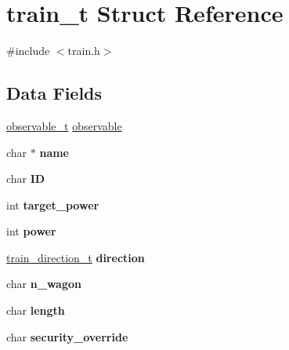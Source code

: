\hypertarget{structtrain__t}{\section{train\-\_\-t Struct Reference}
\label{structtrain__t}
}


{\ttfamily \#include $<$train.\-h$>$}

\subsection*{Data Fields}
\begin{DoxyCompactItemize}
\item 
\hyperlink{structobservable__t}{observable\-\_\-t} \hyperlink{structtrain__t_a39d603215eb7e0ade0ee0fbbb14f0685}{observable}
\item 
\hypertarget{structtrain__t_a866388e08694084c03d04d70c3c9541e}{char $\ast$ {\bfseries name}}\label{structtrain__t_a866388e08694084c03d04d70c3c9541e}

\item 
\hypertarget{structtrain__t_ab1d435bd12429c65c6cacfcba690e2f6}{char {\bfseries I\-D}}\label{structtrain__t_ab1d435bd12429c65c6cacfcba690e2f6}

\item 
\hypertarget{structtrain__t_aaca9fd05b60b4fae0e8e9c61373ebd28}{int {\bfseries target\-\_\-power}}\label{structtrain__t_aaca9fd05b60b4fae0e8e9c61373ebd28}

\item 
\hypertarget{structtrain__t_affb09a51187c77a7e31b3226d4768b4b}{int {\bfseries power}}\label{structtrain__t_affb09a51187c77a7e31b3226d4768b4b}

\item 
\hypertarget{structtrain__t_a395f5703d9b8bdb98cc5ecff8478bab1}{\hyperlink{group__train__t__structs_gae1037d4e4a5a1fe1c4bbe139091ef3a2}{train\-\_\-direction\-\_\-t} {\bfseries direction}}\label{structtrain__t_a395f5703d9b8bdb98cc5ecff8478bab1}

\item 
\hypertarget{structtrain__t_a573e717c3e431a70f049507500e3a3aa}{char {\bfseries n\-\_\-wagon}}\label{structtrain__t_a573e717c3e431a70f049507500e3a3aa}

\item 
\hypertarget{structtrain__t_a5b7a54e0da50f0c90d2771d5e6d156ab}{char {\bfseries length}}\label{structtrain__t_a5b7a54e0da50f0c90d2771d5e6d156ab}

\item 
\hypertarget{structtrain__t_af1798a3b0292a4180ea6cc6780d94846}{char {\bfseries security\-\_\-override}}\label{structtrain__t_af1798a3b0292a4180ea6cc6780d94846}


\end{DoxyCompactItemize}
